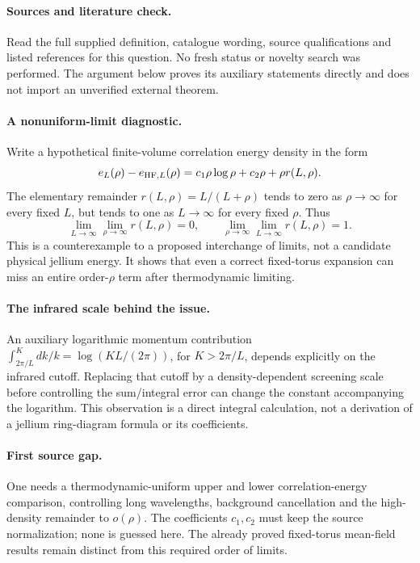 \documentclass[11pt]{article}
\begin{document}
\paragraph{Sources and literature check.}
Read the full supplied definition, catalogue wording, source qualifications and listed references for this question. No fresh status or novelty search was performed. The argument below proves its auxiliary statements directly and does not import an unverified external theorem.

\paragraph{A nonuniform-limit diagnostic.} Write a hypothetical finite-volume correlation energy density in the form
\[
 e_L(\rho)-e_{{\rm HF},L}(\rho)
 =c_1\rho\log\rho+c_2\rho+\rho r(L,\rho).
\]
The elementary remainder \(r(L,\rho)=L/(L+\rho)\) tends to zero as \(\rho\to\infty\) for every fixed \(L\), but tends to one as \(L\to\infty\) for every fixed \(\rho\). Thus
\[
 \lim_{L\to\infty}\lim_{\rho\to\infty}r(L,\rho)=0,
 \qquad
 \lim_{\rho\to\infty}\lim_{L\to\infty}r(L,\rho)=1.
\]
This is a counterexample to a proposed interchange of limits, not a candidate physical jellium energy. It shows that even a correct fixed-torus expansion can miss an entire order-\(\rho\) term after thermodynamic limiting.
\paragraph{The infrared scale behind the issue.} An auxiliary logarithmic momentum contribution \(\int_{2\pi/L}^K dk/k=\log(KL/(2\pi))\), for \(K>2\pi/L\), depends explicitly on the infrared cutoff. Replacing that cutoff by a density-dependent screening scale before controlling the sum/integral error can change the constant accompanying the logarithm. This observation is a direct integral calculation, not a derivation of a jellium ring-diagram formula or its coefficients.
\paragraph{First source gap.} One needs a thermodynamic-uniform upper and lower correlation-energy comparison, controlling long wavelengths, background cancellation and the high-density remainder to \(o(\rho)\). The coefficients \(c_1,c_2\) must keep the source normalization; none is guessed here. The already proved fixed-torus mean-field results remain distinct from this required order of limits.
\end{document}
